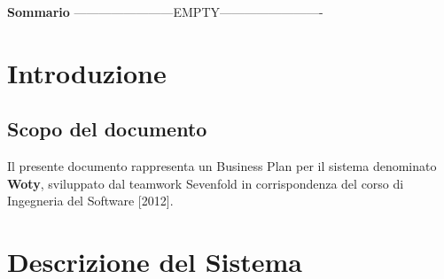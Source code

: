 
\newpage

\vspace*{0.5cm} %
\begin{center}

\textbf{{\huge{Sommario}}}
------------------------EMPTY-------------------------

\vspace*{0.2cm} %

\end{center}






\newpage

\tableofcontents %

\let\cleardoublepage\clearpage %

\listoftables

\listoffigures




\newpage
\section{Introduzione}


\subsection{Scopo del documento}
Il presente documento rappresenta un Business Plan per il sistema denominato \textbf{Woty},  sviluppato dal teamwork Sevenfold in corrispondenza del corso di Ingegneria del Software [2012].\\





\section{Descrizione del Sistema}

